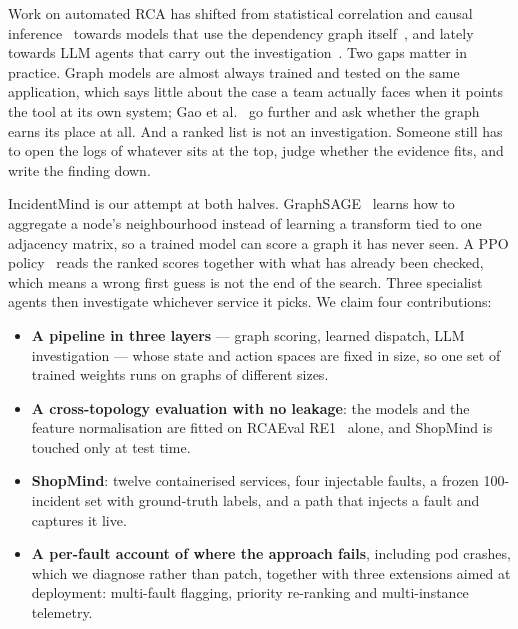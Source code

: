 \documentclass[conference,a4paper]{IEEEtran}
\begin{document}
Work on automated RCA has shifted from statistical correlation and causal inference~\cite{pham2024howfar,li2022circa} towards models that use the dependency graph itself~\cite{yu2021microrank,lee2023eadro,zhao2024chase}, and lately towards LLM agents that carry out the investigation~\cite{roy2024llmagents,chen2024rcacopilot,pei2025flowofaction,xu2025openrca}. Two gaps matter in practice. Graph models are almost always trained and tested on the same application, which says little about the case a team actually faces when it points the tool at its own system; Gao et al.~\cite{gao2025diagmlp} go further and ask whether the graph earns its place at all. And a ranked list is not an investigation. Someone still has to open the logs of whatever sits at the top, judge whether the evidence fits, and write the finding down.

IncidentMind is our attempt at both halves. GraphSAGE~\cite{hamilton2017graphsage} learns how to aggregate a node's neighbourhood instead of learning a transform tied to one adjacency matrix, so a trained model can score a graph it has never seen. A PPO policy~\cite{schulman2017ppo} reads the ranked scores together with what has already been checked, which means a wrong first guess is not the end of the search. Three specialist agents then investigate whichever service it picks. We claim four contributions:
\begin{itemize}
    \item \textbf{A pipeline in three layers} --- graph scoring, learned dispatch, LLM investigation --- whose state and action spaces are fixed in size, so one set of trained weights runs on graphs of different sizes.
    \item \textbf{A cross-topology evaluation with no leakage}: the models and the feature normalisation are fitted on RCAEval RE1~\cite{pham2025rcaeval} alone, and ShopMind is touched only at test time.
    \item \textbf{ShopMind}: twelve containerised services, four injectable faults, a frozen 100-incident set with ground-truth labels, and a path that injects a fault and captures it live.
    \item \textbf{A per-fault account of where the approach fails}, including pod crashes, which we diagnose rather than patch, together with three extensions aimed at deployment: multi-fault flagging, priority re-ranking and multi-instance telemetry.
\end{itemize}

\end{document}
